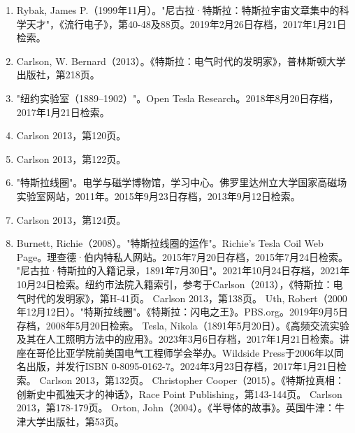 \begin{enumerate}
\item Rybak, James P.（1999年11月）。"尼古拉·特斯拉：特斯拉宇宙文章集中的科学天才"，《流行电子》，第40-48及88页。2019年2月26日存档，2017年1月21日检索。  
\item Carlson, W. Bernard（2013）。《特斯拉：电气时代的发明家》，普林斯顿大学出版社，第218页。  
\item "纽约实验室（1889–1902）"。Open Tesla Research。2018年8月20日存档，2017年1月21日检索。  
\item Carlson 2013，第120页。  
\item Carlson 2013，第122页。  
\item "特斯拉线圈"。电学与磁学博物馆，学习中心。佛罗里达州立大学国家高磁场实验室网站，2011年。2015年9月23日存档，2013年9月12日检索。
\item Carlson 2013，第124页。  
\item Burnett, Richie（2008）。"特斯拉线圈的运作"。Richie's Tesla Coil Web Page。理查德·伯内特私人网站。2015年7月20日存档，2015年7月24日检索。  
"尼古拉·特斯拉的入籍记录，1891年7月30日"。2021年10月24日存档，2021年10月24日检索。纽约市法院入籍索引，参考于Carlson（2013），《特斯拉：电气时代的发明家》，第H-41页。  
Carlson 2013，第138页。  
Uth, Robert（2000年12月12日）。"特斯拉线圈"。《特斯拉：闪电之王》。PBS.org。2019年9月5日存档，2008年5月20日检索。  
Tesla, Nikola（1891年5月20日）。《高频交流实验及其在人工照明方法中的应用》。2023年3月6日存档，2017年1月21日检索。讲座在哥伦比亚学院前美国电气工程师学会举办。Wildside Press于2006年以同名出版，并发行ISBN 0-8095-0162-7。2024年3月23日存档，2017年1月21日检索。  
Carlson 2013，第132页。  
Christopher Cooper（2015）。《特斯拉真相：创新史中孤独天才的神话》，Race Point Publishing，第143-144页。  
Carlson 2013，第178-179页。  
Orton, John（2004）。《半导体的故事》。英国牛津：牛津大学出版社，第53页。
\end{enumerate}